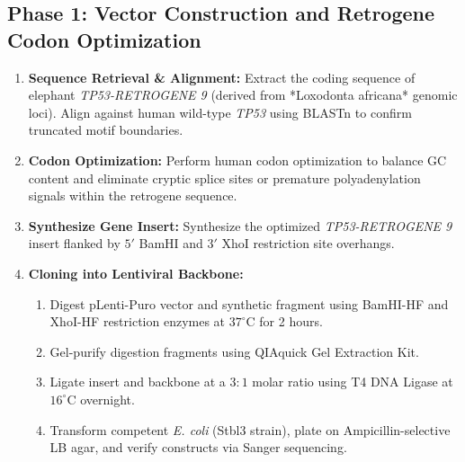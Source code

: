 \documentclass[12pt]{article}
\begin{document}
\subsection{Phase 1: Vector Construction and Retrogene Codon Optimization}
\begin{enumerate}
    \item \textbf{Sequence Retrieval \& Alignment:} Extract the coding sequence of elephant \textit{TP53-RETROGENE 9} (derived from *Loxodonta africana* genomic loci). Align against human wild-type \textit{TP53} using BLASTn to confirm truncated motif boundaries.
    \item \textbf{Codon Optimization:} Perform human codon optimization to balance GC content and eliminate cryptic splice sites or premature polyadenylation signals within the retrogene sequence.
    \item \textbf{Synthesize Gene Insert:} Synthesize the optimized \textit{TP53-RETROGENE 9} insert flanked by $5'$ BamHI and $3'$ XhoI restriction site overhangs.
    \item \textbf{Cloning into Lentiviral Backbone:}
        \begin{enumerate}
            \item Digest pLenti-Puro vector and synthetic fragment using BamHI-HF and XhoI-HF restriction enzymes at $37^\circ\text{C}$ for 2 hours.
            \item Gel-purify digestion fragments using QIAquick Gel Extraction Kit.
            \item Ligate insert and backbone at a $3:1$ molar ratio using T4 DNA Ligase at $16^\circ\text{C}$ overnight.
            \item Transform competent \textit{E. coli} (Stbl3 strain), plate on Ampicillin-selective LB agar, and verify constructs via Sanger sequencing.
        \end{enumerate}
\end{enumerate}
\end{document}
